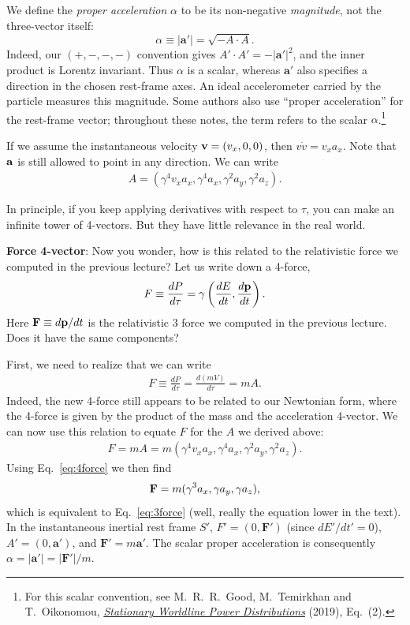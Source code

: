 \documentclass[12pt]{article}
\newcommand{\be}{\begin{eqnarray}}
\newcommand{\ee}{\end{eqnarray}}
\begin{document}
We define the \emph{proper acceleration} $\alpha$ to be its non-negative \emph{magnitude}, not the three-vector itself:
\[
\boxed{\alpha\equiv|\mathbf a'|=\sqrt{-A\cdot A}.}
\]
Indeed, our $(+,-,-,-)$ convention gives $A'\cdot A'=-|\mathbf a'|^2$, and the inner product is Lorentz invariant. Thus $\alpha$ is a scalar, whereas $\mathbf a'$ also specifies a direction in the chosen rest-frame axes. An ideal accelerometer carried by the particle measures this magnitude. Some authors also use ``proper acceleration'' for the rest-frame vector; throughout these notes, the term refers to the scalar $\alpha$.\footnote{For this scalar convention, see M.~R.~R.~Good, M.~Temirkhan and T.~Oikonomou, \href{https://arxiv.org/abs/1907.01751}{\textit{Stationary Worldline Power Distributions}} (2019), Eq.~(2).}

If we assume the instantaneous velocity ${\bf v}=(v_x,0,0)$, then $v\dot v=v_xa_x$. Note that ${\bf a}$ is still allowed to point in any direction. We can write
\be
A = (\gamma^4 v_x a_x, \gamma^4 a_x, \gamma^2 a_y, \gamma^2 a_z).
\ee

In principle, if you keep applying derivatives with respect to $\tau$, you can make an infinite tower of 4-vectors. But they have little relevance in the real world. 

\vspace{2em}

\noindent 
{\bf Force 4-vector}: Now you wonder, how is this related to the relativistic force we computed in the previous lecture? Let us write down a 4-force, 
\be
F \equiv \frac{dP}{d\tau} = \gamma\left(\frac{dE}{dt}, \frac{d{\bf p}}{dt}\right). \label{eq:4force}
\ee
Here ${\bf F} \equiv d{\bf p}/dt$ is the relativistic 3 force we computed in the previous lecture. Does it have the same components? 

First, we need to realize that we can write 
\be
F\equiv \frac{dP}{d\tau} = \frac{d (mV)}{d\tau} = m A.
\ee
Indeed, the new 4-force still appears to be related to our Newtonian form, where the 4-force is given by the product of the mass and the acceleration 4-vector. We can now use this relation to equate $F$ for the $A$ we derived above:
\be
F = mA = m(\gamma^4 v_x a_x, \gamma^4 a_x, \gamma^2 a_y, \gamma^2 a_z).
\ee
Using Eq.~\eqref{eq:4force} we then find
\be
{\bf F} = m(\gamma^3 a_x, \gamma a_y, \gamma a_z),
\ee
which is equivalent to Eq.~\eqref{eq:3force} (well, really the equation lower in the text). In the instantaneous inertial rest frame $S'$, $F'=(0,\mathbf F')$ (since $dE'/dt'=0$), $A'=(0,\mathbf a')$, and $\mathbf F'=m\mathbf a'$. The scalar proper acceleration is consequently $\alpha=|\mathbf a'|=|\mathbf F'|/m$.
\end{document}
